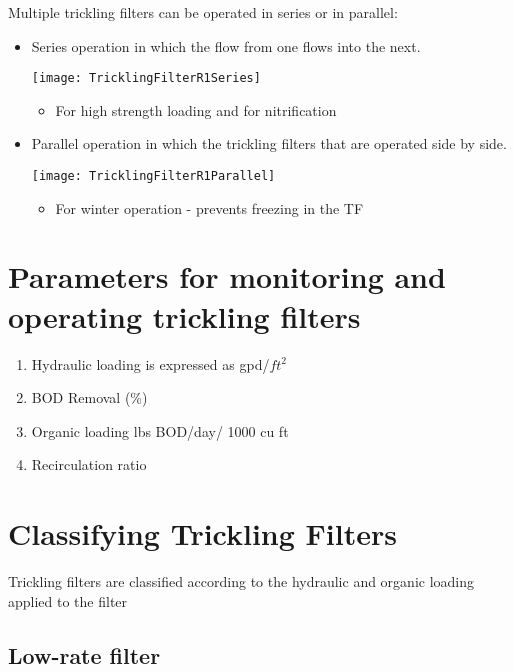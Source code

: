 Multiple trickling filters can be operated in series or in parallel:\\
\begin{itemize}
\item Series operation in which the flow from one flows into the next.
\begin{center}
\texttt{[image: TricklingFilterR1Series]}
\end{center}  
\begin{itemize}
\item For high strength loading and for nitrification
\end{itemize}
\item Parallel operation in which the trickling filters that are operated side by side.
\begin{center}
\texttt{[image: TricklingFilterR1Parallel]}
\end{center}
\begin{itemize}
\item For winter operation - prevents freezing in the TF
\end{itemize}
\end{itemize}

\section{Parameters for monitoring and operating trickling filters}



\begin{enumerate}
\item Hydraulic loading is expressed as gpd/$ft^2$
\item BOD Removal (\%)
\item Organic loading lbs BOD/day/ 1000 cu ft
\item Recirculation ratio
\end{enumerate}


\section{Classifying Trickling Filters}			
Trickling filters are classified according to the hydraulic and organic loading applied to the  filter\\

\subsection{Low-rate filter}

